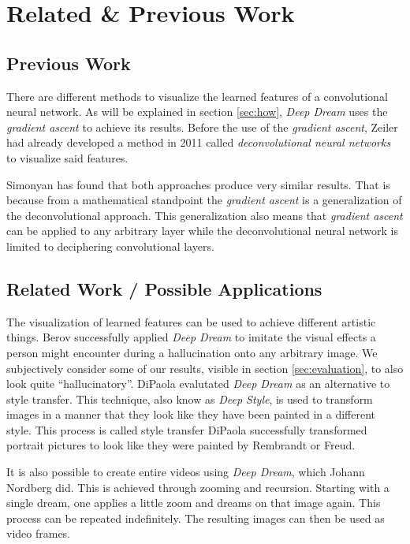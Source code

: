 \section{Related \& Previous Work}
\label{sec:previous-work}
\subsection{Previous Work}
There are different methods to visualize the learned features of a convolutional neural network.
As will be explained in section \ref{sec:how}, \textit{Deep Dream} uses the \textit{gradient ascent} to achieve its results.
Before the use of the \textit{gradient ascent}, Zeiler had already developed a method in 2011 called \emph{deconvolutional neural networks} to visualize said features.\cite{zeiler2011adaptive}

Simonyan has found that both approaches produce very similar results.
That is because from a mathematical standpoint the \textit{gradient ascent} is a generalization of the deconvolutional approach.
This generalization also means that \textit{gradient ascent} can be applied to any arbitrary layer while the deconvolutional neural network is limited to deciphering convolutional layers.\cite{simonyan2013deep}

\subsection{Related Work / Possible Applications}
The visualization of learned features can be used to achieve different artistic things.
Berov successfully applied \textit{Deep Dream} to imitate the visual effects a person might encounter during a hallucination onto any arbitrary image.\cite{berov2016visual}
We subjectively consider some of our results, visible in section \ref{sec:evaluation}, to also look quite \enquote{hallucinatory}.
DiPaola evalutated \textit{Deep Dream} as an alternative to style transfer.
This technique, also know as \emph{Deep Style}, is used to transform images in a manner that they look like they have been painted in a different style.\cite{dipaola2016using}
This process is called style transfer
DiPaola successfully transformed portrait pictures to look like they were painted by Rembrandt or Freud.

It is also possible to create entire videos using \textit{Deep Dream}, which Johann Nordberg did.\cite{deep-dream-video}
This is achieved through zooming and recursion.
Starting with a single dream, one applies a little zoom and dreams on that image again.
This process can be repeated indefinitely.
The resulting images can then be used as video frames.

